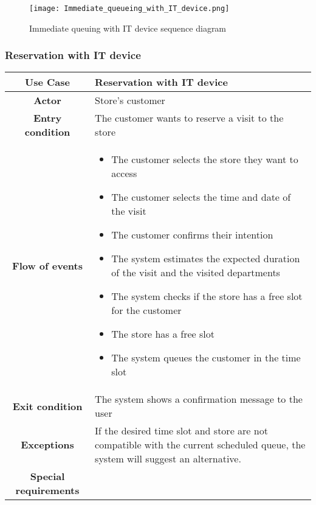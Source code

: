 \documentclass[../../main.tex]{subfiles}
\begin{document}
      \begin{figure}[H]
        \centering
        \texttt{[image: Immediate\_queueing\_with\_IT\_device.png]}
        \caption{Immediate queuing with IT device sequence diagram}
      \end{figure}

      \subsubsection{Reservation with IT device}

      \begin{table}[H]
        \centering
          \begin{tabular}{c m{}}
          \hline
          \textbf{Use Case} & Reservation with IT device\\ \hline
          \textbf{Actor} & Store's customer\\ \hline
          \textbf{Entry condition} & The customer wants to reserve a visit to the store\\  \hline
          \textbf{Flow of events} & \begin{itemize}
                                      \item The customer selects the store they want to access
                                      \item The customer selects the time and date of the visit
                                      \item The customer confirms their intention
                                      \item The system estimates the expected duration of the visit and the visited departments
                                      \item The system checks if the store has a free slot for the customer
                                      \item The store has a free slot
                                      \item The system queues the customer in the time slot
                                    \end{itemize}\\ \hline
          \textbf{Exit condition} & The system shows a confirmation message to the user \\ \hline
          \textbf{Exceptions} & If the desired time slot and store are not compatible with the current scheduled queue, the system will suggest an alternative. \\ \hline
          \textbf{Special requirements} &\\ \hline
          \end{tabular}
      \end{table}
\end{document}
